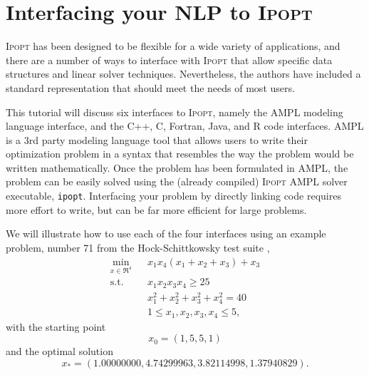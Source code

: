\documentclass[10pt]{article}
\newcommand{\Ipopt}{\textsc{Ipopt}\xspace}
\begin{document}
\begin{itemize}
%

\end{itemize}


\section{Interfacing your NLP to \Ipopt}
\label{sec:tutorial-example}

\Ipopt has been designed to be flexible for a wide variety of
applications, and there are a number of ways to interface with \Ipopt
that allow specific data structures and linear solver
techniques. Nevertheless, the authors have included a standard
representation that should meet the needs of most users.

This tutorial will discuss six interfaces to \Ipopt, namely the AMPL
modeling language \cite{FouGayKer:AMPLbook} interface, and the C++, C,
Fortran, Java, and R code interfaces.  AMPL is a 3rd party modeling language
tool that allows users to write their optimization problem in a syntax
that resembles the way the problem would be written mathematically.
Once the problem has been formulated in AMPL, the problem can be
easily solved using the (already compiled) \Ipopt AMPL solver
executable, {\tt ipopt}. Interfacing your problem by directly linking
code requires more effort to write, but can be far more efficient for
large problems.

We will illustrate how to use each of the four interfaces using an
example problem, number 71 from the Hock-Schittkowsky test suite \cite{HS},
  \begin{eqnarray}
    \min_{x \in \Re^4} &&x_1 x_4 (x_1 + x_2 + x_3)  +  x_3 \label{eq:ex_obj} \\
    \mbox{s.t.}  &&x_1 x_2 x_3 x_4 \ge 25 \label{eq:ex_ineq} \\
    &&x_1^2 + x_2^2 + x_3^2 + x_4^2  =  40 \label{eq:ex_equ} \\
    &&1 \leq x_1, x_2, x_3, x_4 \leq 5, \label{eq:ex_bounds}
  \end{eqnarray}
with the starting point
\begin{equation}
x_0 = (1, 5, 5, 1) \label{eq:ex_startpt}
\end{equation}
and the optimal solution
\[
x_* = (1.00000000, 4.74299963, 3.82114998, 1.37940829). \nonumber
\]
\end{document}
